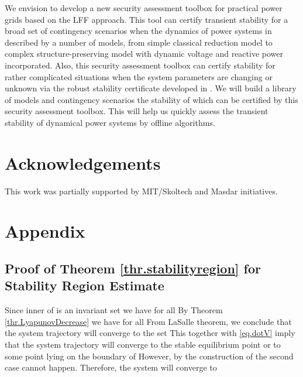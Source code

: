 \documentclass[final]{IEEEtran}
\begin{document}
We envision to develop a new security assessment toolbox for practical power grids based on the LFF approach. This tool can certify transient stability for a broad set of contingency scenarios when the dynamics of power systems in described by a number of models, from simple classical reduction model to complex
structure-preserving model with dynamic voltage and reactive power incorporated. Also, this security assessment toolbox can certify stability for rather complicated situations when the system parameters are changing or unknown via the robust stability certificate developed in \cite{Vu:2014acc}. We will build a library of models and contingency scenarios the stability of which can be certified by this security assessment toolbox. This will help us quickly assess the transient stability of dynamical power systems by offline algorithms.  

\section{Acknowledgements}
This work was partially supported by MIT/Skoltech and
Masdar initiatives.

\section{Appendix}
\subsection{Proof of Theorem \ref{thr.stabilityregion} for Stability Region Estimate}
\label{appen:estimate}

Since inner of  is an invariant set we have  for all  By Theorem \ref{thr.LyapunovDecrease}
we have  for all  From LaSalle theorem, we conclude that the system trajectory  will converge to the 
set  This together with \eqref{eq.dotV} imply that the system trajectory will converge to the stable equilibrium point 
or to some point lying on the boundary of  However, by the construction of  the second case cannot happen. Therefore, the system 
will converge to 



\end{document}
